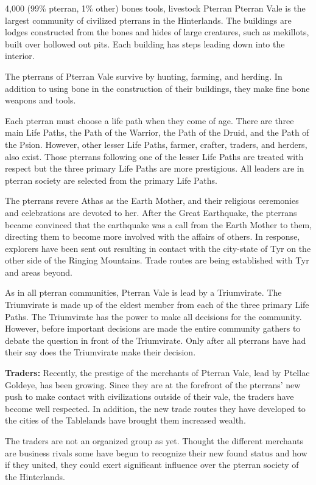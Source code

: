 {4,000 (99\% pterran, 1\% other)}
{bones tools, livestock}
{Pterran}
{
	Pterran Vale is the largest community of civilized pterrans in the Hinterlands. The buildings are lodges constructed from the bones and hides of large creatures, such as mekillots, built over hollowed out pits. Each building has steps leading down into the interior.
}
{
	The pterrans of Pterran Vale survive by hunting, farming, and herding. In addition to using bone in the construction of their buildings, they make fine bone weapons and tools.

	Each pterran must choose a life path when they come of age. There are three main Life Paths, the Path of the Warrior, the Path of the Druid, and the Path of the Psion. However, other lesser Life Paths, farmer, crafter, traders, and herders, also exist. Those pterrans following one of the lesser Life Paths are treated with respect but the three primary Life Paths are more prestigious. All leaders are in pterran society are selected from the primary Life Paths.

	The pterrans revere Athas as the Earth Mother, and their religious ceremonies and celebrations are devoted to her. After the Great Earthquake, the pterrans became convinced that the earthquake was a call from the Earth Mother to them, directing them to become more involved with the affairs of others. In response, explorers have been sent out resulting in contact with the city-state of Tyr on the other side of the Ringing Mountains. Trade routes are being established with Tyr and areas beyond.
}
{
	As in all pterran communities, Pterran Vale is lead by a Triumvirate. The Triumvirate is made up of the eldest member from each of the three primary Life Paths. The Triumvirate has the power to make all decisions for the community. However, before important decisions are made the entire community gathers to debate the question in front of the Triumvirate. Only after all pterrans have had their say does the Triumvirate make their decision.
}
{
	\textbf{Traders:} Recently, the prestige of the merchants of Pterran Vale, lead by Ptellac Goldeye, has been growing. Since they are at the forefront of the pterrans' new push to make contact with civilizations outside of their vale, the traders have become well respected. In addition, the new trade routes they have developed to the cities of the Tablelands have brought them increased wealth.

	The traders are not an organized group as yet. Thought the different merchants are business rivals some have begun to recognize their new found status and how if they united, they could exert significant influence over the pterran society of the Hinterlands.
}
